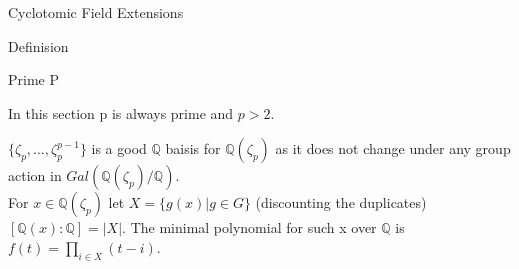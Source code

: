 \documentclass[12pt, letterpaper]{article}
\newcommand{\Q}{\mathbb{Q}}
\begin{document}
\begin{section}{Cyclotomic Field Extensions}
\begin{subsection}{Definision}
    \begin{subsubsection}{Prime P}

      In this section p is always prime and \(p > 2\).

      \(\{\zeta_{p}, \dots , \zeta^{p - 1}_{p}\}\) is a good \(\Q\) baisis for
      \(\Q(\zeta_{p})\) as it does not change under any group action in
      \(Gal(\Q(\zeta_{p}) / \Q)\). \\
      For \(x \in \Q(\zeta_{p})\) let \(X = \{g(x) | g \in G\}\)
      (discounting the duplicates) \([\Q(x) : \Q] = | X | \). The minimal
      polynomial for such x over \(\Q\) is \(f(t) = \prod_{i \in X} (t - i)\).

    \end{subsubsection}

  \end{subsection}

\end{section}
\end{document}
